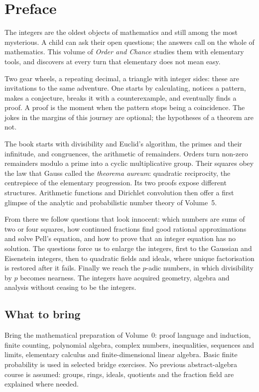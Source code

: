 \chapter*{Preface}
The integers are the oldest objects of mathematics and still among the most mysterious. A child can ask their
open questions; the answers call on the whole of mathematics. This volume of \emph{Order and Chance}
studies them with elementary tools, and discovers at every turn that elementary does not mean easy.

Two gear wheels, a repeating decimal, a triangle with integer sides: these are invitations to the same adventure.
One starts by calculating, notices a pattern, makes a conjecture, breaks it with a counterexample, and eventually
finds a proof. A proof is the moment when the pattern stops being a coincidence. The jokes in the margins of
this journey are optional; the hypotheses of a theorem are not.

The book starts with divisibility and Euclid's algorithm, the primes and their infinitude, and congruences, the
arithmetic of remainders. Orders turn non-zero remainders modulo a prime into
a cyclic multiplicative group. Their squares obey the law that Gauss called
the \emph{theorema aureum}: quadratic reciprocity, the centrepiece of the
elementary progression. Its two proofs expose different structures.
Arithmetic functions and Dirichlet convolution then offer a first glimpse
of the analytic and probabilistic number theory of Volume~5.

From there we follow questions that look innocent: which numbers are sums of two or four squares, how
continued fractions find good rational approximations and solve Pell's equation, and how to prove that an
integer equation has no solution. The questions force us to enlarge the integers, first to the Gaussian and
Eisenstein integers, then to quadratic fields and ideals, where unique factorisation is restored after it fails.
Finally we reach the $p$-adic numbers, in which divisibility by $p$ becomes nearness. The integers have acquired
geometry, algebra and analysis without ceasing to be the integers.

\section*{What to bring}
Bring the mathematical preparation of Volume~0: proof language and induction,
finite counting, polynomial algebra, complex numbers, inequalities,
sequences and limits, elementary calculus and finite-dimensional linear algebra.
Basic finite probability is used in selected bridge exercises.
No previous abstract-algebra course is assumed: groups, rings, ideals,
quotients and the fraction field are explained where needed.

